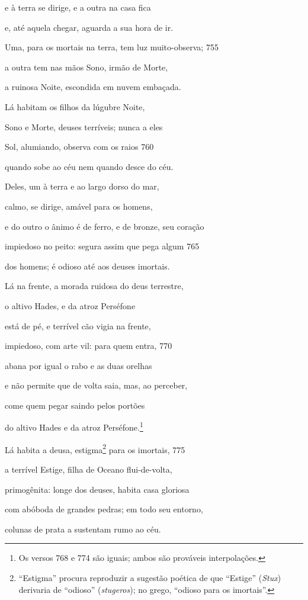 e à terra se dirige, e a outra na casa fica

e, até aquela chegar, aguarda a sua hora de ir.

Uma, para os mortais na terra, tem luz muito-observa; \num{755}

a outra tem nas mãos Sono, irmão de Morte,

a ruinosa Noite, escondida em nuvem embaçada.

\quad{}Lá habitam os filhos da lúgubre Noite,

Sono e Morte, deuses terríveis; nunca a eles

Sol, alumiando, observa com os raios \num{760}

quando sobe ao céu nem quando desce do céu.

Deles, um à terra e ao largo dorso do mar,

calmo, se dirige, amável para os homens,

e do outro o ânimo é de ferro, e de bronze, seu coração

impiedoso no peito: segura assim que pega algum \num{765}

dos homens; é odioso até aos deuses imortais.

\quad{}Lá na frente, a morada ruidosa do deus terrestre,

o altivo Hades, e da atroz Perséfone

está de pé, e terrível cão vigia na frente,

impiedoso, com arte vil: para quem entra, \num{770}

abana por igual o rabo e as duas orelhas

e não permite que de volta saia, mas, ao perceber,

come quem pegar saindo pelos portões

do altivo Hades e da atroz Perséfone.\footnote{Os versos 768 e 774 são iguais; ambos são prováveis interpolações.}

\quad{}Lá habita a deusa, estigma\footnote{``Estigma'' procura reproduzir a sugestão poética de que
``Estige'' (\emph{Stux}) derivaria de ``odioso'' (\emph{stugeros}); no
grego, ``odioso para os imortais''.} para os imortais, \num{775}

a terrível Estige, filha de Oceano flui-de-volta,

primogênita: longe dos deuses, habita casa gloriosa

com abóboda de grandes pedras; em todo seu entorno,

colunas de prata a sustentam rumo ao céu.

